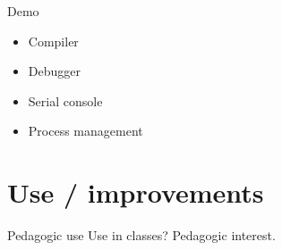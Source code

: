 \documentclass{beamer}
\begin{document}
  \begin{frame}{Demo}
    \begin{itemize}
      \item Compiler
      \item Debugger
      \item Serial console
      \item Process management
    \end{itemize}
  \end{frame}

  \section{Use / improvements}

  \begin{frame}{Pedagogic use}
      Use in classes? Pedagogic interest.
  \end{frame}
\end{document}
